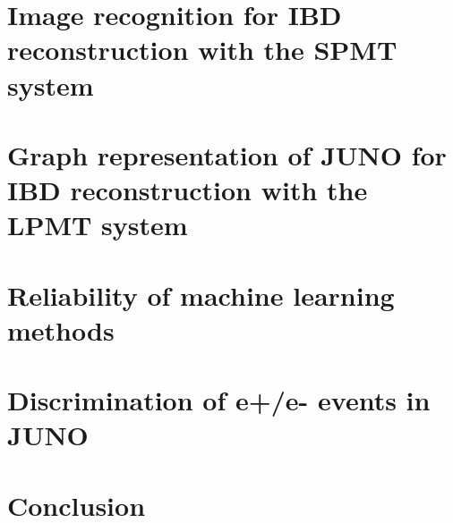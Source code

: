 \documentclass[
10pt, %
english, %
onehalfspacing, %
nolistspacing, %
toctotoc, %
headsepline, %
]{MastersDoctoralThesis} %
\begin{document}

\newcommand*{\bnue}{\ensuremath{\bar{\nu}_{e}}}


\frontmatter %

\pagestyle{plain} %


\mainmatter


\tableofcontents

\pagestyle{thesis}
\singlespacing











\chapter{Image recognition for IBD reconstruction with the SPMT system}

\chapter{Graph representation of JUNO for IBD reconstruction with the LPMT system}

\chapter{Reliability of machine learning methods}

\chapter{Discrimination of e+/e- events in JUNO}

\chapter{Conclusion}

\printbibliography[heading=bibintoc]
\end{document}
